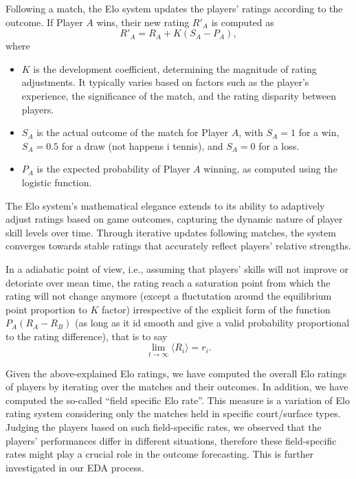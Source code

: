\documentclass[preprint,aps,nofootinbib,a4paper,superscriptaddress,longbibliography,amsfonts,amssymb,amsmath,titlepage]{revtex4-2}
\begin{document}
Following a match, the Elo system updates the players' ratings according to the outcome. If Player $A$ wins, their new rating $R'_A$ is computed as
%
\begin{equation}\label{eq: elo-rate-update}
R'_A = R_A + K (S_A - P_A),
\end{equation}
%
where
%
\begin{itemize}
\item $K$ is the development coefficient, determining the magnitude of rating adjustments. It typically varies based on factors such as the player's experience, the significance of the match, and the rating disparity between players.
\item $S_A$ is the actual outcome of the match for Player $A$, with $S_A = 1$ for a win, $S_A = 0.5$ for a draw (not happens i tennis), and $S_A = 0$ for a loss.
\item $P_A$ is the expected probability of Player $A$ winning, as computed using the logistic function.
\end{itemize}
%
The Elo system's mathematical elegance extends to its ability to adaptively adjust ratings based on game outcomes, capturing the dynamic nature of player skill levels over time. Through iterative updates following matches, the system converges towards stable ratings that accurately reflect players' relative strengths.

In a adiabatic point of view, i.e., assuming that players' skills will not improve or detoriate over mean time, the rating reach a saturation point from which the rating will not change anymore (except a fluctutation around the equilibrium point proportion to $K$ factor) irrespective of the explicit form of the function $P_A (R_A - R_B)$ (as long as it id smooth and give a valid probability proportional to the rating difference), that is to say
%
\begin{equation}
\lim_{t \to \infty} \langle R_i \rangle = r_i.
\end{equation}
%

Given the above-explained Elo ratings, we have computed the overall Elo ratings of players by iterating over the matches and their outcomes. In addition, we have computed the so-called ``field specific Elo rate''. This measure is a variation of Elo rating system considering only the matches held in specific court/surface types. Judging the players based on such field-specific rates, we observed that the players' performances differ in different situations, therefore these field-specific rates might play a crucial role in the outcome forecasting. This is further investigated in our EDA process.
\end{document}
